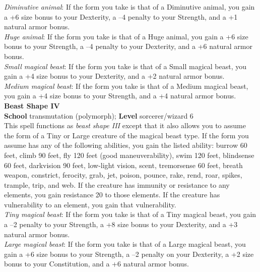 \textit{Diminutive animal}: If the form you take is that of a Diminutive animal, you gain a +6 size bonus to your Dexterity, a –4 penalty to your Strength, and a +1 natural armor bonus.\\
\textit{Huge animal}: If the form you take is that of a Huge animal, you gain a +6 size bonus to your Strength, a –4 penalty to your Dexterity, and a +6 natural armor bonus.\\
\textit{Small magical beast}: If the form you take is that of a Small magical beast, you gain a +4 size bonus to your Dexterity, and a +2 natural armor bonus.\\
\textit{Medium magical beast}: If the form you take is that of a Medium magical beast, you gain a +4 size bonus to your Strength, and a +4 natural armor bonus.\\
\textbf{Beast Shape IV}\\
\textbf{School }transmutation (polymorph); \textbf{Level }sorcerer/wizard 6\\
This spell functions as \textit{beast shape III }except that it also allows you to assume the form of a Tiny or Large creature of the magical beast type. If the form you assume has any of the following abilities, you gain the listed ability: burrow 60 feet, climb 90 feet, fly 120 feet (good maneuverability), swim 120 feet, blindsense 60 feet, darkvision 90 feet, low-light vision, scent, tremorsense 60 feet, breath weapon, constrict, ferocity, grab, jet, poison, pounce, rake, rend, roar, spikes, trample, trip, and web. If the creature has immunity or resistance to any elements, you gain resistance 20 to those elements. If the creature has vulnerability to an element, you gain that vulnerability.\\
\textit{Tiny magical beast}: If the form you take is that of a Tiny magical beast, you gain a –2 penalty to your Strength, a +8 size bonus to your Dexterity, and a +3 natural armor bonus.\\
\textit{Large magical beast}: If the form you take is that of a Large magical beast, you gain a +6 size bonus to your Strength, a –2 penalty on your Dexterity, a +2 size bonus to your Constitution, and a +6 natural armor bonus.\\
